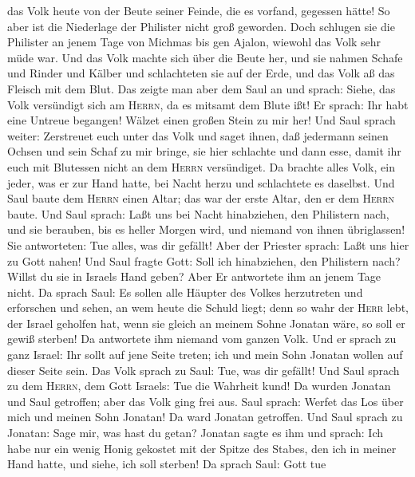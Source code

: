 das Volk heute von der Beute seiner Feinde, die es vorfand, gegessen
hätte! So aber ist die Niederlage der Philister nicht groß geworden.
 Doch schlugen sie die Philister an jenem Tage von
Michmas bis gen Ajalon, wiewohl das Volk sehr müde war. 
Und das Volk machte sich über die Beute her, und sie nahmen Schafe und
Rinder und Kälber und schlachteten sie auf der Erde, und das Volk aß das
Fleisch mit dem Blut.  Das zeigte man aber dem Saul an
und sprach: Siehe, das Volk versündigt sich am \textsc{Herrn}, da es
mitsamt dem Blute ißt! Er sprach: Ihr habt eine Untreue begangen! Wälzet
einen großen Stein zu mir her!  Und Saul sprach weiter:
Zerstreuet euch unter das Volk und saget ihnen, daß jedermann seinen
Ochsen und sein Schaf zu mir bringe, sie hier schlachte und dann esse,
damit ihr euch mit Blutessen nicht an dem \textsc{Herrn} versündiget. Da
brachte alles Volk, ein jeder, was er zur Hand hatte, bei Nacht herzu
und schlachtete es daselbst.  Und Saul baute dem
\textsc{Herrn} einen Altar; das war der erste Altar, den er dem
\textsc{Herrn} baute.  Und Saul sprach: Laßt uns bei
Nacht hinabziehen, den Philistern nach, und sie berauben, bis es heller
Morgen wird, und niemand von ihnen übriglassen! Sie antworteten: Tue
alles, was dir gefällt! Aber der Priester sprach: Laßt uns hier zu Gott
nahen!  Und Saul fragte Gott: Soll ich hinabziehen, den
Philistern nach? Willst du sie in Israels Hand geben? Aber Er antwortete
ihm an jenem Tage nicht.  Da sprach Saul: Es sollen alle
Häupter des Volkes herzutreten und erforschen und sehen, an wem heute
die Schuld liegt;  denn so wahr der \textsc{Herr} lebt,
der Israel geholfen hat, wenn sie gleich an meinem Sohne Jonatan wäre,
so soll er gewiß sterben! Da antwortete ihm niemand vom ganzen Volk.
 Und er sprach zu ganz Israel: Ihr sollt auf jene Seite
treten; ich und mein Sohn Jonatan wollen auf dieser Seite sein. Das Volk
sprach zu Saul: Tue, was dir gefällt!  Und Saul sprach zu
dem \textsc{Herrn}, dem Gott Israels: Tue die Wahrheit kund! Da wurden
Jonatan und Saul getroffen; aber das Volk ging frei aus. 
Saul sprach: Werfet das Los über mich und meinen Sohn Jonatan! Da ward
Jonatan getroffen.  Und Saul sprach zu Jonatan: Sage mir,
was hast du getan?  Jonatan sagte es ihm und sprach: Ich
habe nur ein wenig Honig gekostet mit der Spitze des Stabes, den ich in
meiner Hand hatte, und siehe, ich soll sterben! Da sprach Saul: Gott tue
